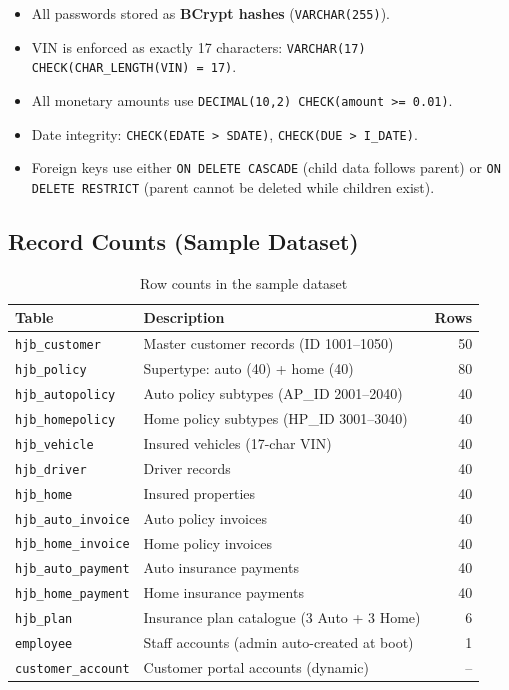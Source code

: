 \documentclass[12pt,letterpaper]{article}
\begin{document}
\begin{itemize}
  \item All passwords stored as \textbf{BCrypt hashes} (\texttt{VARCHAR(255)}).
  \item VIN is enforced as exactly 17 characters: \texttt{VARCHAR(17) CHECK(CHAR\_LENGTH(VIN) = 17)}.
  \item All monetary amounts use \texttt{DECIMAL(10,2) CHECK(amount >= 0.01)}.
  \item Date integrity: \texttt{CHECK(EDATE > SDATE)}, \texttt{CHECK(DUE > I\_DATE)}.
  \item Foreign keys use either \texttt{ON DELETE CASCADE} (child data follows parent) or \texttt{ON DELETE RESTRICT} (parent cannot be deleted while children exist).
\end{itemize}

\subsection{Record Counts (Sample Dataset)}

\begin{table}[H]
\centering
\begin{tabular}{llr}
\toprule
\textbf{Table} & \textbf{Description} & \textbf{Rows} \\
\midrule
\texttt{hjb\_customer}      & Master customer records (ID 1001--1050)      & 50 \\
\texttt{hjb\_policy}        & Supertype: auto (40) + home (40)             & 80 \\
\texttt{hjb\_autopolicy}    & Auto policy subtypes (AP\_ID 2001--2040)     & 40 \\
\texttt{hjb\_homepolicy}    & Home policy subtypes (HP\_ID 3001--3040)     & 40 \\
\texttt{hjb\_vehicle}       & Insured vehicles (17-char VIN)               & 40 \\
\texttt{hjb\_driver}        & Driver records                               & 40 \\
\texttt{hjb\_home}          & Insured properties                           & 40 \\
\texttt{hjb\_auto\_invoice} & Auto policy invoices                          & 40 \\
\texttt{hjb\_home\_invoice} & Home policy invoices                          & 40 \\
\texttt{hjb\_auto\_payment} & Auto insurance payments                      & 40 \\
\texttt{hjb\_home\_payment} & Home insurance payments                      & 40 \\
\texttt{hjb\_plan}          & Insurance plan catalogue (3 Auto + 3 Home)  & 6  \\
\texttt{employee}           & Staff accounts (admin auto-created at boot)  & 1  \\
\texttt{customer\_account}  & Customer portal accounts (dynamic)           & --  \\
\bottomrule
\end{tabular}
\caption{Row counts in the sample dataset}
\end{table}
\end{document}
